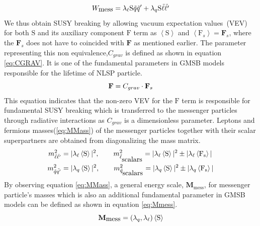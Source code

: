 {\begin{equation}{\label{eq:WMESS}}
W_{\mbox{mess}} = \lambda_{\ell}\mathrm{S}\tilde{q}\tilde{q}^{\prime} + \lambda_{q}\mathrm{S}\tilde{\ell}\tilde{\ell^{\prime}}
\end{equation}
We thus obtain SUSY breaking by allowing vacuum expectation values~(VEV) for both $\mathrm{S}$ and its auxiliary component $\mathrm{F}$ term as $\left\langle \mathrm{S} \right\rangle$ and $\left\langle \mathrm{F}_{s} \right\rangle = \mathbf{F}_{s}$, where the $\mathbf{F}_{s}$ does not have to coincided with $\mathbf{F}$ as mentioned earlier. The parameter representing this non equivalence,$C_{grav}$ is defined as shown in equation \ref{eq:CGRAV}. It is one of the fundamental parameters in GMSB models responsible for the lifetime of NLSP particle.
\begin{equation}{\label{eq:CGRAV}}
\mathbf{F} = C_{grav}\cdot\mathbf{F}_{s}
\end{equation}
This equation indicates that the non-zero VEV for the $\mathrm{F}$ term is responsible for fundamental SUSY breaking which is transferred to the messenger particles through radiative interactions as $C_{grav}$ is a dimensionless parameter.
Leptons and fermions masses(\ref{eq:MMass}) of the messenger particles together with their scalar superpartners are obtained from diagonalizing the mass matrix.
\begin{align}{\label{eq:MMass}}
m^{2}_{\tilde{\ell}\tilde{\ell^{\prime}}} &= |\lambda_{\ell}\left\langle \mathrm{S} \right\rangle|^{2}, \quad \quad  m^{2}_{\tilde{\ell}_{\mbox{scalars}}} = |\lambda_{\ell}\left\langle \mathrm{S} \right\rangle|^{2} \pm |\lambda_{\ell}\left\langle \mathrm{F_{s}} \right\rangle |
\\
m^{2}_{\tilde{q}\tilde{q^{\prime}}} &= |\lambda_{q}\left\langle \mathrm{S} \right\rangle|^{2}, \quad \quad  m^{2}_{\tilde{q}_{\mbox{scalars}}} = |\lambda_{q}\left\langle \mathrm{S} \right\rangle|^{2} \pm |\lambda_{q}\left\langle \mathrm{F_{s}} \right\rangle |
\end{align}
By observing equation \ref{eq:MMass}, a general energy scale, $\mathbf{M}_{\mbox{mess}}$, for messenger particle's masses which is also an additional fundamental parameter in GMSB models can be defined as shown in equation \ref{eq:Mmess}.
\begin{equation}{\label{eq:Mmess}}
\mathbf{M}_{\mbox{mess}} = (\lambda_{q},\lambda_{\ell}) \left\langle \mathrm{S} \right\rangle 
\end{equation}

}

